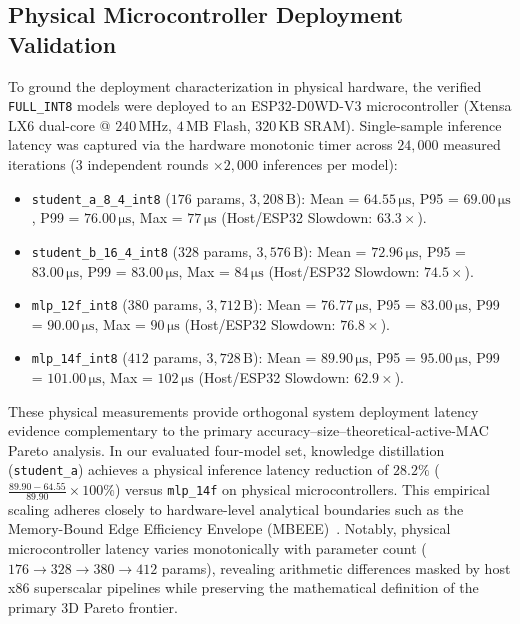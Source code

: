 \documentclass[journal,10pt]{IEEEtran}
\begin{document}
\subsection{Physical Microcontroller Deployment Validation}
To ground the deployment characterization in physical hardware, the verified \texttt{FULL\_INT8} models were deployed to an ESP32-D0WD-V3 microcontroller (Xtensa LX6 dual-core @ $240\,\text{MHz}$, $4\,\text{MB}$ Flash, $320\,\text{KB}$ SRAM). Single-sample inference latency was captured via the hardware monotonic timer  across $24,000$ measured iterations ($3$ independent rounds $\times 2,000$ inferences per model):
\begin{itemize}
    \item \texttt{student\_a\_8\_4\_int8} ($176$ params, $3,208\,\text{B}$): Mean = $64.55\,\si{\micro\second}$, P95 = $69.00\,\si{\micro\second}$, P99 = $76.00\,\si{\micro\second}$, Max = $77\,\si{\micro\second}$ (Host/ESP32 Slowdown: $63.3\times$).
    \item \texttt{student\_b\_16\_4\_int8} ($328$ params, $3,576\,\text{B}$): Mean = $72.96\,\si{\micro\second}$, P95 = $83.00\,\si{\micro\second}$, P99 = $83.00\,\si{\micro\second}$, Max = $84\,\si{\micro\second}$ (Host/ESP32 Slowdown: $74.5\times$).
    \item \texttt{mlp\_12f\_int8} ($380$ params, $3,712\,\text{B}$): Mean = $76.77\,\si{\micro\second}$, P95 = $83.00\,\si{\micro\second}$, P99 = $90.00\,\si{\micro\second}$, Max = $90\,\si{\micro\second}$ (Host/ESP32 Slowdown: $76.8\times$).
    \item \texttt{mlp\_14f\_int8} ($412$ params, $3,728\,\text{B}$): Mean = $89.90\,\si{\micro\second}$, P95 = $95.00\,\si{\micro\second}$, P99 = $101.00\,\si{\micro\second}$, Max = $102\,\si{\micro\second}$ (Host/ESP32 Slowdown: $62.9\times$).
\end{itemize}
These physical measurements provide orthogonal system deployment latency evidence complementary to the primary accuracy--size--theoretical-active-MAC Pareto analysis. In our evaluated four-model set, knowledge distillation (\texttt{student\_a}) achieves a physical inference latency reduction of $28.2\%$ ($\frac{89.90 - 64.55}{89.90} \times 100\%$) versus \texttt{mlp\_14f} on physical microcontrollers. This empirical scaling adheres closely to hardware-level analytical boundaries such as the Memory-Bound Edge Efficiency Envelope (MBEEE)~\cite{narendra2026mbeee}. Notably, physical microcontroller latency varies monotonically with parameter count ($176 \rightarrow 328 \rightarrow 380 \rightarrow 412$ params), revealing arithmetic differences masked by host x86 superscalar pipelines while preserving the mathematical definition of the primary 3D Pareto frontier.
\end{document}
